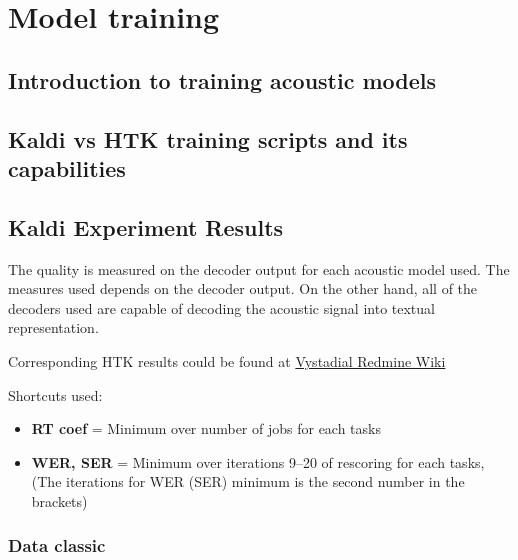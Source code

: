 \chapter{Model training}
\label{cha:model_training_models}

\section{Introduction to training acoustic models} 
\label{sec:introduction_to_training_acoustic_models}



\section[Kaldi vs HTK]{Kaldi vs HTK training scripts and its capabilities} 
\label{sec:kaldi_htk}


\section{Kaldi Experiment Results} %
\label{sec:exp_results}

The quality is measured on the decoder output for each acoustic model used. The measures used depends on the decoder output. On the other hand, all of the decoders used are capable of decoding the acoustic signal into textual representation. 

Corresponding HTK results could be found at
\href{https://redmine.ms.mff.cuni.cz/projects/vystadial/wiki/Acoustic_models/} {Vystadial Redmine Wiki}

Shortcuts used:
\begin{itemize}
    \item {\bf RT coef} = Minimum over number of jobs for each tasks
    \item {\bf WER, SER} = Minimum over iterations 9--20 of rescoring for each tasks, 
        (The iterations for WER (SER) minimum is the second number in the brackets)
\end{itemize}

\subsection*{Data classic}

